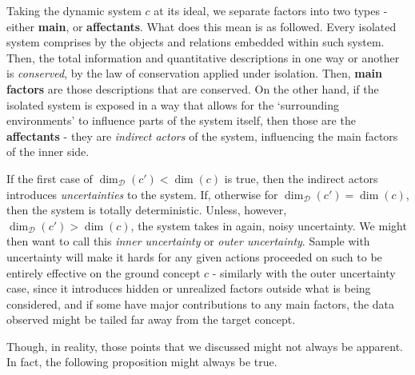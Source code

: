 \documentclass{article}
\begin{document}
Taking the dynamic system $c$ at its ideal, we separate factors into two types - either \textbf{main}, or \textbf{affectants}. What does this mean is as followed. Every isolated system comprises by the objects and relations embedded within such system. Then, the total information and quantitative descriptions in one way or another is \textit{conserved}, by the law of conservation applied under isolation. Then, \textbf{main factors} are those descriptions that are conserved. On the other hand, if the isolated system is exposed in a way that allows for the `surrounding environments' to influence parts of the system itself, then those are the \textbf{affectants} - they are \textit{indirect actors} of the system, influencing the main factors of the inner side. 

If the first case of $\dim_{\mathcal{D}}{(c')} < \dim{(c)}$ is true, then the indirect actors introduces \textit{uncertainties} to the system. If, otherwise for $\dim_{\mathcal{D}}{(c')} = \dim{(c)}$, then the system is totally deterministic. Unless, however, $\dim_{\mathcal{D}}{(c')} > \dim{(c)}$, the system takes in again, noisy uncertainty. We might then want to call this \textit{inner uncertainty} or \textit{outer uncertainty}. Sample with uncertainty will make it hards for any given actions proceeded on such to be entirely effective on the ground concept $c$ - similarly with the outer uncertainty case, since it introduces hidden or unrealized factors outside what is being considered, and if some have major contributions to any main factors, the data observed might be tailed far away from the target concept. 

Though, in reality, those points that we discussed might not always be apparent. In fact, the following proposition might always be true. 
\end{document}
